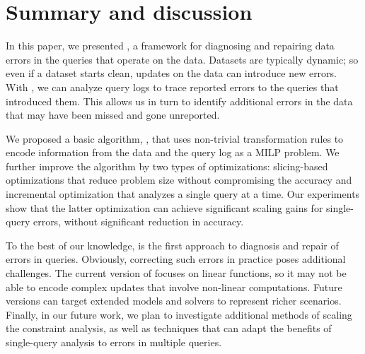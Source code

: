 
\section{Summary and discussion}

In this paper, we presented \sys, a framework for diagnosing and
repairing data errors in the queries that operate on the data.
Datasets are typically dynamic; so even if a dataset starts clean,
updates on the data can introduce new errors. With \sys, we can
analyze query logs to trace reported errors to the queries that
introduced them. This allows us in turn to identify additional errors
in the data that may have been missed and gone unreported.

We proposed a basic algorithm, \naive, that uses non-trivial transformation rules to
encode information from the data and the query log as a MILP problem. We further improve 
the \naive algorithm by two types of optimizations: slicing-based optimizations that reduce problem
size without compromising the accuracy and 
incremental optimization that analyzes a single query at a time. 
Our experiments show that the latter
optimization can achieve significant scaling gains for single-query
errors, without significant reduction in accuracy.

To the best of our knowledge, \sys is the first approach to diagnosis
and repair of errors in queries. Obviously, correcting such errors in
practice poses additional challenges. 
The current version of \sys focuses on linear functions, so it may not
be able to encode complex updates that involve non-linear
computations. Future versions can target extended models and solvers
to represent richer scenarios. Finally, in our future work, we plan to
investigate additional methods of scaling the constraint analysis, as
well as techniques that can adapt the benefits of single-query
analysis to errors in multiple queries.






